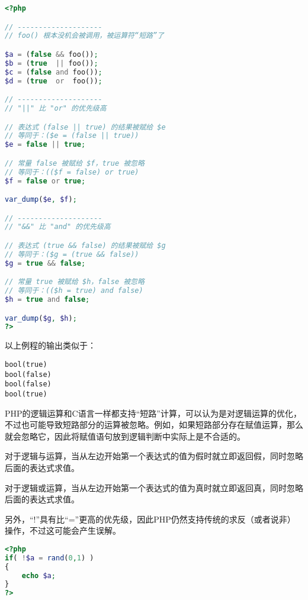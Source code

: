 \begin{lstlisting}[language=PHP]
<?php

// --------------------
// foo() 根本没机会被调用，被运算符“短路”了

$a = (false && foo());
$b = (true  || foo());
$c = (false and foo());
$d = (true  or  foo());

// --------------------
// "||" 比 "or" 的优先级高

// 表达式 (false || true) 的结果被赋给 $e
// 等同于：($e = (false || true))
$e = false || true;

// 常量 false 被赋给 $f，true 被忽略
// 等同于：(($f = false) or true)
$f = false or true;

var_dump($e, $f);

// --------------------
// "&&" 比 "and" 的优先级高

// 表达式 (true && false) 的结果被赋给 $g
// 等同于：($g = (true && false))
$g = true && false;

// 常量 true 被赋给 $h，false 被忽略
// 等同于：(($h = true) and false)
$h = true and false;

var_dump($g, $h);
?>
\end{lstlisting}

以上例程的输出类似于：

\begin{verbatim}
bool(true)
bool(false)
bool(false)
bool(true)
\end{verbatim}

PHP的逻辑运算和C语言一样都支持“短路”计算，可以认为是对逻辑运算的优化，不过也可能导致短路部分的运算被忽略。例如，如果短路部分存在赋值运算，那么就会忽略它，因此将赋值语句放到逻辑判断中实际上是不合适的。



\begin{compactitem}
\item 对于逻辑与运算，当从左边开始第一个表达式的值为假时就立即返回假，同时忽略后面的表达式求值。
\item 对于逻辑或运算，当从左边开始第一个表达式的值为真时就立即返回真，同时忽略后面的表达式求值。
\end{compactitem}

另外，“!”具有比“=”更高的优先级，因此PHP仍然支持传统的求反（或者说非）操作，不过这可能会产生误解。

\begin{lstlisting}[language=PHP]
<?php
if( !$a = rand(0,1) )
{
	echo $a;
}
?>
\end{lstlisting}

